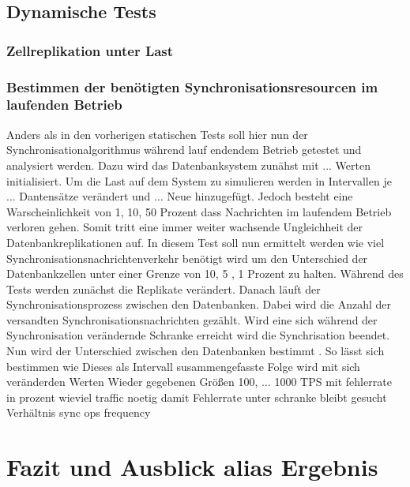 \documentclass[a4paper,11pt,oneside,%
headsepline,												%
footsepline,												%
bibtotocnumbered									%
]{scrreprt}
\begin{document}
\section{Dynamische Tests}
\subsection{Zellreplikation unter Last}
\subsection{Bestimmen der benötigten Synchronisationsresourcen im laufenden Betrieb}
Anders als in den vorherigen statischen Tests soll hier nun der Synchronisationalgorithmus während lauf endendem Betrieb getestet und analysiert werden. Dazu wird das Datenbanksystem zunähst mit ... Werten initialisiert. Um die Last auf dem System zu simulieren werden in Intervallen je ... Dantensätze verändert und ... Neue hinzugefügt. Jedoch besteht eine Warscheinlichkeit von 1, 10, 50 Prozent dass Nachrichten im laufendem Betrieb verloren gehen. Somit tritt eine immer weiter wachsende Ungleichheit der Datenbankreplikationen auf. In diesem Test soll nun ermittelt werden wie viel Synchronisationsnachrichtenverkehr benötigt wird um den Unterschied der Datenbankzellen unter einer Grenze von 10, 5 , 1 Prozent zu halten. Während des Tests werden zunächst die Replikate verändert. Danach läuft der Synchronisationsprozess zwischen den Datenbanken. Dabei wird die Anzahl der versandten Synchronisationsnachrichten gezählt. Wird eine sich während der Synchronisation verändernde Schranke erreicht wird die Synchrisation beendet. Nun wird der Unterschied zwischen den Datenbanken bestimmt . So lässt sich bestimmen wie 
Dieses als Intervall susammengefasste Folge wird mit sich veränderden Werten Wieder
gegebenen Größen 100, ...
1000 TPS mit fehlerrate in prozent
wieviel traffic noetig damit Fehlerrate unter schranke bleibt
gesucht Verhältnis
sync ops frequency		
\chapter{Fazit und Ausblick alias Ergebnis}
\end{document}
